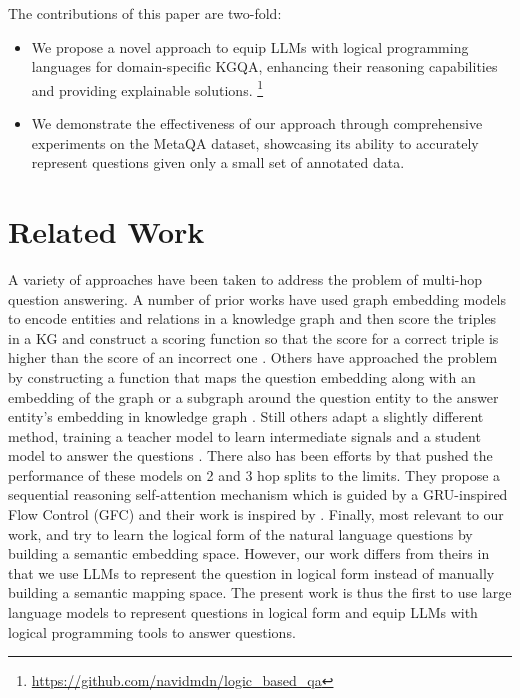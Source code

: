 \documentclass[11pt]{article}
\begin{document}
The contributions of this paper are two-fold: 
\begin{itemize}
    \item We propose a novel approach to equip LLMs with logical programming languages for domain-specific KGQA, enhancing their reasoning capabilities and providing explainable solutions. \footnote{\href{https://github.com/navidmdn/logic_based_qa}{https://github.com/navidmdn/logic\_based\_qa}}
    \item  We demonstrate the effectiveness of our approach through comprehensive experiments on the MetaQA dataset, showcasing its ability to accurately represent questions given only a small set of annotated data.
\end{itemize}


\section{Related Work}
\label{gen_inst}

A variety of approaches have been taken to address the problem of multi-hop question answering. A number of prior works have used graph embedding models to encode entities and relations in a knowledge graph and then score the triples in a KG and construct a scoring function so that the score for a correct triple is higher than the score of an incorrect one  \citep{Nickel2011ATM,Yang2014EmbeddingEA,Balazevic2019TuckERTF,Dettmers2017Convolutional2K,Vashishth2019InteractEIC}. Others have approached the problem by constructing a function that maps the question embedding along with an embedding of the graph or a subgraph around the question entity to the answer entity's embedding in knowledge graph \citep{Sun2018OpenDQ,Saxena2020ImprovingMQ,Sun2019PullNetOD,He2021ImprovingMK}. Still others adapt a slightly different method, training a teacher model to learn intermediate signals and a student model to answer the questions \citep{He2021ImprovingMK}. There also has been efforts by \citep{Xie2022ASF} that pushed the performance of these models on 2 and 3 hop splits to the limits. They propose a sequential reasoning self-attention mechanism which is guided by a GRU-inspired Flow Control (GFC) and their work is inspired by \citep{shi-etal-2021-transfernet}. Finally, most relevant to our work, \citep{Yang2014JointRE} and \citep{Yang2015KnowledgebasedQA} try to learn the logical form of the natural language questions by building a semantic embedding space. However, our work differs from theirs in that we use LLMs to represent the question in logical form instead of manually building a semantic mapping space. The present work is thus the first to use large language models to represent questions in logical form and equip LLMs with logical programming tools to answer questions.
\end{document}
